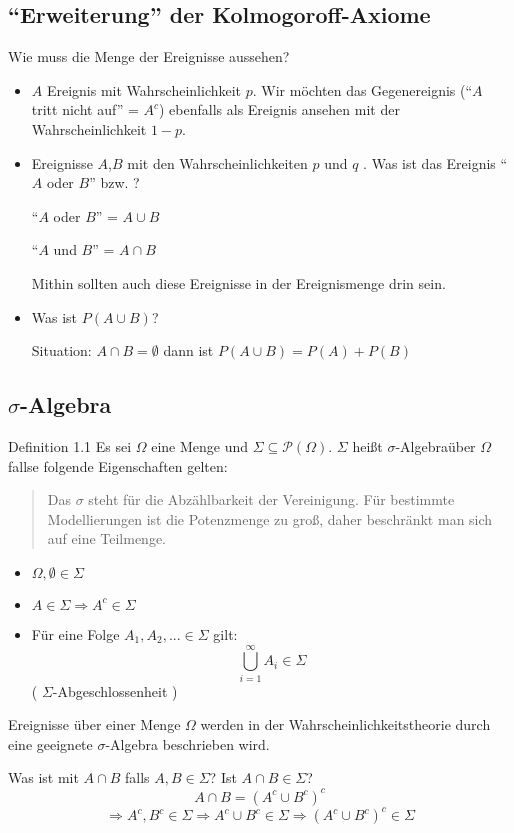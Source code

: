 \subsection{``Erweiterung'' der Kolmogoroff-Axiome}

Wie muss die Menge der Ereignisse aussehen?
\begin{itemize}
 \item $A$ Ereignis mit Wahrscheinlichkeit $p$. Wir möchten das Gegenereignis (``$A$ tritt nicht auf'' = $A^c$) ebenfalls als Ereignis ansehen mit der Wahrscheinlichkeit $1-p$.
 \item Ereignisse $A$,$B$ mit den Wahrscheinlichkeiten $p$ und $q$ . Was ist das Ereignis ``$A$ oder $B$'' bzw. ?

 ``$A$ oder $B$'' = $A \cup B$

 ``$A$ und $B$'' = $A \cap B$

 Mithin sollten auch diese Ereignisse in der Ereignismenge drin sein.
 \item Was ist $P(A \cup B)$?

Situation: $A \cap B = \emptyset$ dann ist $P(A \cup B) = P(A) + P(B)$

\end{itemize}
\subsection{$\sigma$-Algebra}
Definition 1.1 Es sei $\Omega$ eine Menge und $\Sigma \subseteq \mathcal P(\Omega)$. $\Sigma$ heißt $\sigma$-Algebraüber $\Omega$ fallse folgende Eigenschaften gelten:
\begin{quote}
 Das $\sigma$ steht für die Abzählbarkeit der Vereinigung. Für bestimmte Modellierungen ist die Potenzmenge zu groß, daher beschränkt man sich auf eine Teilmenge.
\end{quote}

\begin{itemize}
 \item $\Omega, \emptyset \in \Sigma$
 \item $A \in \Sigma \Rightarrow A^c \in \Sigma$
 \item Für eine Folge $A_1,A_2,... \in \Sigma$ gilt:
$$ \bigcup_{i=1}^\infty A_i \in \Sigma$$ ( $\Sigma$-Abgeschlossenheit )
\end{itemize}
Ereignisse über einer Menge $\Omega$ werden in der Wahrscheinlichkeitstheorie durch eine geeignete $\sigma$-Algebra beschrieben wird.

Was ist mit $A \cap B$ falls $A,B \in \Sigma$? Ist $A \cap B \in \Sigma$?
$$ A \cap B = (A^c \cup B^c)^c$$
$$ \Rightarrow A^c, B^c \in \Sigma \Rightarrow A^c \cup B^c \in \Sigma \Rightarrow (A^c \cup B^c)^c \in \Sigma $$

